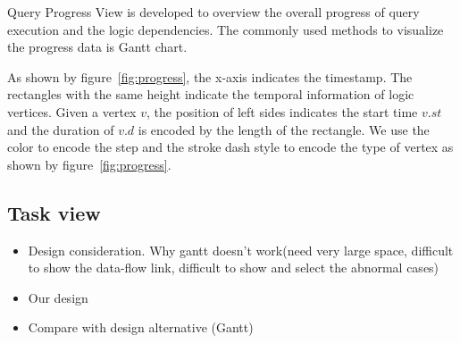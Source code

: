 Query Progress View is developed to overview the overall progress of query execution and the logic dependencies. 
The commonly used methods to visualize the progress data is Gantt chart.

As shown by figure~\ref{fig:progress}, the x-axis indicates the timestamp. The rectangles with the same  height indicate the temporal information of logic vertices. Given a vertex $v$, the position of left sides indicates the start time $v.st$ and the duration of $v.d$ is encoded by the length of the rectangle. We use the color to encode the step and the stroke dash style to encode the type of vertex as shown by figure~\ref{fig:progress}.


\subsection{Task view}
\begin{itemize}
    \item Design consideration. Why gantt doesn't work(need very large space, difficult to show the data-flow link, difficult to show and select the abnormal cases)
    \item Our design
    \item Compare with design alternative (Gantt)
\end{itemize}


